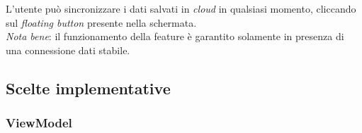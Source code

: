\documentclass{article}
\begin{document}
L'utente può sincronizzare i dati salvati in \textit{cloud} in qualsiasi momento, cliccando sul \textit{floating button} presente nella schermata. \vspace*{7pt}\\
\textit{Nota bene}: il funzionamento della feature è garantito solamente in presenza di una connessione dati stabile.
\newpage
\begin{figure}[h]
    \centering
\end{figure}

\newpage
\subsection*{Scelte implementative}
\subsubsection*{ViewModel}
\end{document}
